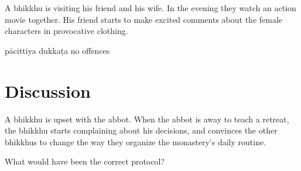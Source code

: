 \begin{exam}{\autoExamName}
\begin{problem*}
\begin{parts}
      \bigskip

      \item A bhikkhu is visiting his friend and his wife. In the evening they
      watch an action movie together. His friend starts to make excited comments
      about the female characters in provocative clothing.

      \bigskip

      \begin{answers}{3}
        \bChoices
         pācittiya\eAns
         dukkaṭa\eAns
         no offences\eAns
        \eChoices
      \end{answers}

    \end{parts}

  \end{problem*}

\end{exam}

\section*{Discussion}

A bhikkhu is upset with the abbot. When the abbot is away to teach a retreat,
the bhikkhu starts complaining about his decisions, and convinces the other
bhikkhus to change the way they organize the monastery's daily routine.

What would have been the correct protocol?
